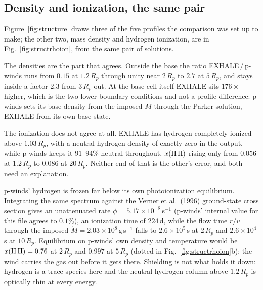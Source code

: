 \documentclass[english,a4paper]{my_memo}
\begin{document}
\subsection{Density and ionization, the same pair}
\label{sec:rhoion}

Figure~\ref{fig:structure} draws three of the five profiles the comparison
was set up to make; the other two, mass density and hydrogen ionization, are
in Fig.~\ref{fig:structrhoion}, from the same pair of solutions.

The densities are the part that agrees. Outside the base the ratio
EXHALE\,/\,p-winds runs from $0.15$ at $1.2\,R_p$ through unity near
$2\,R_p$ to $2.7$ at $5\,R_p$, and stays inside a factor $2.3$ from
$3\,R_p$ out. At the base cell itself EXHALE sits $176\times$ higher, which
is the two lower boundary conditions and not a profile difference: p-winds
sets its base density from the imposed $\dot M$ through the Parker solution,
EXHALE from its own base state.

The ionization does not agree at all. EXHALE has hydrogen completely ionized
above $1.03\,R_p$, with a neutral hydrogen density of exactly zero in the
output, while p-winds keeps it $91$--$94\%$ neutral throughout,
$x({\rm H\,II})$ rising only from $0.056$ at $1.2\,R_p$ to $0.086$ at
$20\,R_p$. Neither end of that is the other's error, and both need an
explanation.

p-winds' hydrogen is frozen far below its own photoionization equilibrium.
Integrating the same spectrum against the Verner et al.\ (1996) ground-state
cross section gives an unattenuated rate
$\phi = 5.17\times10^{-8}$\,s$^{-1}$ (p-winds' internal value for this file
agrees to $0.1\%$), an ionization time of $224$\,d, while the flow time
$r/v$ through the imposed $\dot M = 2.03\times10^{8}$\,g\,s$^{-1}$ falls to
$2.6\times10^{5}$\,s at $2\,R_p$ and $2.6\times10^{4}$\,s at $10\,R_p$.
Equilibrium on p-winds' own density and temperature would be
$x({\rm H\,II}) = 0.76$ at $2\,R_p$ and $0.997$ at $5\,R_p$ (dotted in
Fig.~\ref{fig:structrhoion}b); the wind carries the gas out before it gets
there. Shielding is not what holds it down: hydrogen is a trace species here
and the neutral hydrogen column above $1.2\,R_p$ is optically thin at every
energy.
\end{document}
